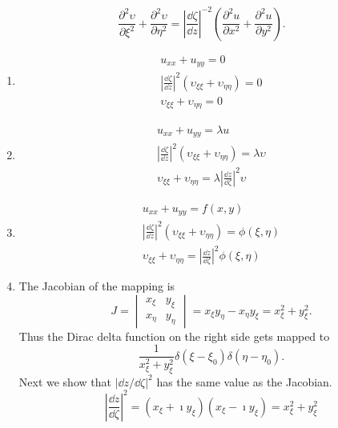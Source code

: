{\begin{Solution}
  \[
  \frac{\partial^2 \upsilon}{\partial \xi^2} + \frac{\partial^2 \upsilon}{\partial \eta^2} =
  \left| \frac{\dd \zeta}{\dd z} \right|^{-2}
  \left( \frac{\partial^2 u}{\partial x^2} + \frac{\partial^2 u}{\partial y^2} \right).
  \]
  \begin{enumerate}
  \item
    \begin{gather*}
      u_{x x} + u_{y y} = 0
      \\
      \left| \frac{\dd \zeta}{\dd z} \right|^2 \left( \upsilon_{\xi \xi} + \upsilon_{\eta \eta} \right) = 0
      \\
      \upsilon_{\xi \xi} + \upsilon_{\eta \eta} = 0
    \end{gather*}
  \item
    \begin{gather*}
      u_{x x} + u_{y y} = \lambda u
      \\
      \left| \frac{\dd \zeta}{\dd z} \right|^2 \left( \upsilon_{\xi \xi} + \upsilon_{\eta \eta} \right) = \lambda \upsilon
      \\
      \upsilon_{\xi \xi} + \upsilon_{\eta \eta} = \lambda \left| \frac{\dd z}{\dd \zeta} \right|^2 \upsilon
    \end{gather*}
  \item
    \begin{gather*}
      u_{x x} + u_{y y} = f(x,y)
      \\
      \left| \frac{\dd \zeta}{\dd z} \right|^2 \left( \upsilon_{\xi \xi} + \upsilon_{\eta \eta} \right) = \phi(\xi,\eta)
      \\
      \upsilon_{\xi \xi} + \upsilon_{\eta \eta} = \left| \frac{\dd z}{\dd \zeta} \right|^2 \phi(\xi,\eta)
    \end{gather*}
  \item
    The Jacobian of the mapping is
    \[
    J = 
    \begin{vmatrix}
      x_\xi & y_\xi \\
      x_\eta & y_\eta
    \end{vmatrix}
    = x_\xi y_\eta - x_\eta y_\xi
    = x_\xi^2 + y_\xi^2.
    \]
    Thus the Dirac delta function on the right side gets mapped to
    \[
    \frac{1}{x_\xi^2 + y_\xi^2} \delta(\xi-\xi_0) \delta(\eta-\eta_0).
    \]
    Next we show that $\left| \dd z / \dd \zeta \right|^2$ has the same value as 
    the Jacobian.
    \[
    \left| \frac{\dd z}{\dd \zeta} \right|^2
    = (x_\xi + \imath y_\xi)(x_\xi - \imath y_\xi) 
    = x_\xi^2 + y_\xi^2
\]
\end{enumerate}
\end{Solution}}
